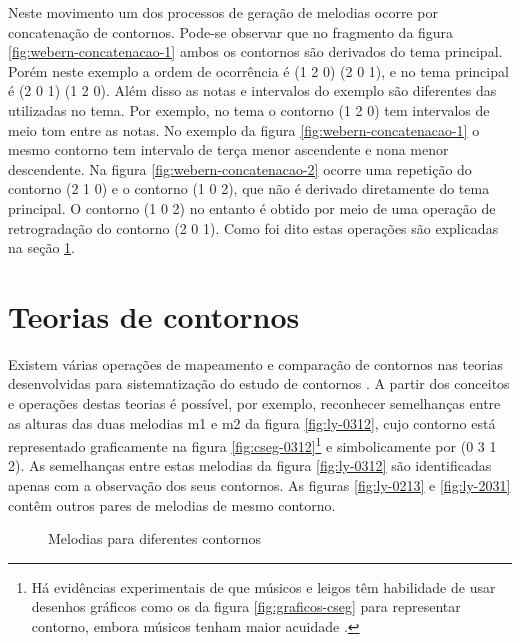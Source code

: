 Neste movimento um dos processos de geração de melodias ocorre por
concatenação de contornos. Pode-se observar que no fragmento da figura
\ref{fig:webern-concatenacao-1} ambos os contornos são derivados do
tema principal. Porém neste exemplo a ordem de ocorrência é (1 2 0) (2
0 1), e no tema principal é (2 0 1) (1 2 0). Além disso as notas e
intervalos do exemplo são diferentes das utilizadas no tema. Por
exemplo, no tema o contorno (1 2 0) tem intervalos de meio tom entre
as notas. No exemplo da figura \ref{fig:webern-concatenacao-1} o mesmo
contorno tem intervalo de terça menor ascendente e nona menor
descendente. Na figura \ref{fig:webern-concatenacao-2} ocorre uma
repetição do contorno (2 1 0) e o contorno (1 0 2), que não é derivado
diretamente do tema principal. O contorno (1 0 2) no entanto é obtido
por meio de uma operação de retrogradação do contorno (2 0 1). Como
foi dito estas operações são explicadas na seção
\ref{sec:teor-de-cont}.

\section{Teorias de contornos}
\label{sec:teor-de-cont}

Existem várias operações de mapeamento e comparação de contornos nas
teorias desenvolvidas para sistematização do estudo de contornos
\cite{friedmann85:methodology,friedmann87:response,morris87:composition,morris93:directions,marvin.ea87:relating,clifford95:contour,polansky.ea92:possible,quinn97:fuzzy,beard03:contour}.
A partir dos conceitos e operações destas teorias é possível, por
exemplo, reconhecer semelhanças entre as alturas das duas melodias m1
e m2 da figura \ref{fig:ly-0312}, cujo contorno está representado
graficamente na figura \ref{fig:cseg-0312}\footnote{Há evidências
  experimentais de que músicos e leigos têm habilidade de usar
  desenhos gráficos como os da figura \ref{fig:graficos-cseg} para
  representar contorno, embora músicos tenham maior acuidade
  \cite[p. 69]{marvin88:generalized}.} e simbolicamente por (0 3 1 2).
As semelhanças entre estas melodias da figura \ref{fig:ly-0312} são
identificadas apenas com a observação dos seus contornos. As figuras
\ref{fig:ly-0213} e \ref{fig:ly-2031} contêm outros pares de melodias
de mesmo contorno.

\begin{figure}
  \centering
  \quad

  \caption{Melodias para diferentes contornos}
  \label{fig:melodias-cseg}
\end{figure}

